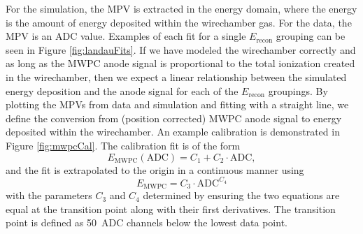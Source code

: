 For the simulation, the MPV is extracted in the energy domain, where the energy is the
amount of energy deposited within the wirechamber gas. For the data, the MPV is an ADC value.
Examples of each fit for a single $E_{\mathrm{recon}}$ grouping can be seen in Figure \ref{fig:landauFits}.
If we
have modeled the wirechamber correctly and as long as the MWPC anode signal is proportional to
the total ionization created in the wirechamber, then we expect a linear relationship between the
simulated energy deposition and the anode signal for each of the $E_{\mathrm{recon}}$ groupings. By plotting
the MPVs from data and simulation and fitting with a straight line, we define the conversion
from (position corrected) MWPC anode signal to energy deposited within the wirechamber. An example
calibration is demonstrated in Figure \ref{fig:mwpcCal}. The calibration fit is of the form
%
\begin{equation} \label{eq:pureLin}
  E_{\mathrm{MWPC}}(\mathrm{ADC}) = C_1 + C_2\cdot \mathrm{ADC},
\end{equation}
and the fit is extrapolated to the origin in a continuous manner using
\begin{equation}
  E_{\mathrm{MWPC}} = C_3 \cdot \mathrm{ADC}^{C_4}
\end{equation}
with the parameters $C_3$ and $C_4$ determined by ensuring the two equations are equal at the
transition point along with their first derivatives. The transition point is defined as 50~ADC channels
below the lowest data point.

